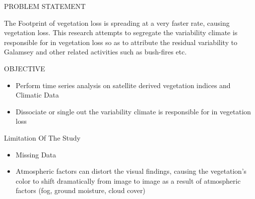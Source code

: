\documentclass[11pt]{beamer}
\begin{document}
\begin{frame}
		\begin{block}{PROBLEM STATEMENT}
			
			The Footprint of vegetation loss is spreading at a very faster rate, causing vegetation loss.
			This research attempts to segregate the variability climate is responsible for in vegetation loss so as to attribute the residual variability to Galamsey and other related activities such as bush-fires etc.
			
		\end{block}
	\begin{block}{OBJECTIVE}
		
		
		\begin{itemize}
			\item Perform time series analysis on satellite derived vegetation indices and Climatic Data
			
			
			\item Dissociate or single out the variability climate is responsible for in vegetation loss
		\end{itemize}
	\end{block}
	\begin{block}{Limitation Of The Study}		
	


\begin{itemize}
	\item Missing Data
	\item Atmospheric factors can distort the visual findings, causing the vegetation's color to shift dramatically from image to image as a result of atmospheric factors (fog, ground moisture, cloud cover)
\end{itemize}
	\end{block}
\end{frame}
\end{document}
